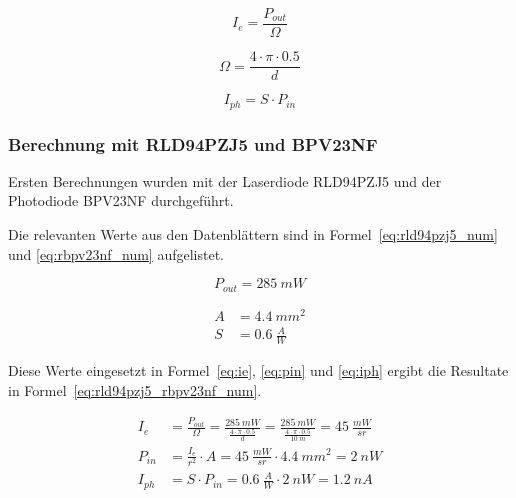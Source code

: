 \documentclass[11pt,a4paper,hidelinks]{article}
\begin{document}
\begin{equation}\label{eq:ie}
    I_e = \frac{P_{out}}{\Omega}
\end{equation}

\begin{equation}\label{eq:omega}
    \Omega = \frac{4\cdot \pi \cdot 0.5}{d}
\end{equation}

\begin{equation}\label{eq:iph}
    I_{ph} = S \cdot P_{in}
\end{equation}

\subsubsection{Berechnung mit RLD94PZJ5 und BPV23NF}

Ersten Berechnungen wurden mit der Laserdiode RLD94PZJ5 \cite{rohm2020rld94pzj5_datasheet} und der Photodiode BPV23NF \cite{vishay2024bpv23nf_datasheet} durchgeführt.

Die relevanten Werte aus den Datenblättern sind in Formel~\ref{eq:rld94pzj5_num} und \ref{eq:rbpv23nf_num} aufgelistet.

\begin{equation}\label{eq:rld94pzj5_num}
    P_{out} = 285~mW
\end{equation}

\begin{equation}\label{eq:rbpv23nf_num}
    \begin{split}
        A &= 4.4~mm^2\\
        S &= 0.6~\frac{A}{W}
    \end{split}
\end{equation}

Diese Werte eingesetzt in Formel~\ref{eq:ie}, \ref{eq:pin} und \ref{eq:iph} ergibt die Resultate in Formel~\ref{eq:rld94pzj5_rbpv23nf_num}.

\begin{equation}\label{eq:rld94pzj5_rbpv23nf_num}
    \begin{split}
        I_e    &= \frac{P_{out}}{\Omega} = \frac{285~mW}{\frac{4\cdot \pi \cdot 0.5}{d}} = \frac{285~mW}{\frac{4\cdot \pi \cdot 0.5}{10~m}} = 45~\frac{mW}{sr}\\
        P_{in} &= \frac{I_e}{r^2} \cdot A = 45~\frac{mW}{sr} \cdot 4.4~mm^2 = 2~nW\\
        I_{ph} &= S \cdot P_{in} = 0.6~\frac{A}{W} \cdot 2~nW = 1.2~nA
    \end{split}
\end{equation}
\end{document}
